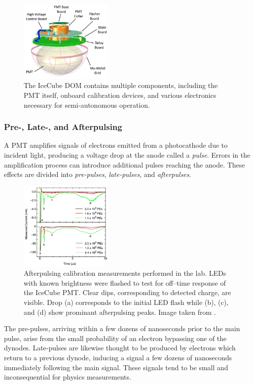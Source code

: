 \begin{figure}
\centering
\includegraphics[width=0.4\textwidth]{icecube_dom.png}
\caption[The IceCube DOM]{The IceCube DOM contains multiple components, including the PMT itself, onboard calibration devices, and various electronics necessary for semi-autonomous operation.}
\label{fig:icecube_dom}
\end{figure}

\label{subsubsec:pulsing}
\subsubsection{Pre-, Late-, and Afterpulsing}
A PMT amplifies signals of electrons emitted from a photocathode due to incident light, producing a voltage drop at the anode called a \emph{pulse}.
Errors in the amplification process can introduce additional pulses reaching the anode.
These effects are divided into \emph{pre-pulses}, \emph{late-pulses}, and \emph{afterpulses}.

\begin{figure}
\centering
\includegraphics[width=0.4\textwidth]{afterpulsing.png} 
\caption[Afterpulsing calibrations in IceCube]{Afterpulsing calibration measurements performed in the lab. LEDs with known brightness were flashed to test for off–time response of the IceCube PMT. Clear dips, corresponding to detected charge, are visible. Drop (a) corresponds to the initial LED flash while (b), (c), and (d) show prominant afterpulsing peaks. Image taken from \cite{IceCube-PMT}.}
\end{figure}
The pre-pulses, arriving within a few dozens of nanoseconds prior to the main pulse, arise from the small probability of an electron bypassing one of the dynodes. 
Late-pulses are likewise thought to be produced by electrons which return to a previous dynode, inducing a signal a few dozens of nanoseconds immediately following the main signal.
These signals tend to be small and inconsequential for physics measurements.

